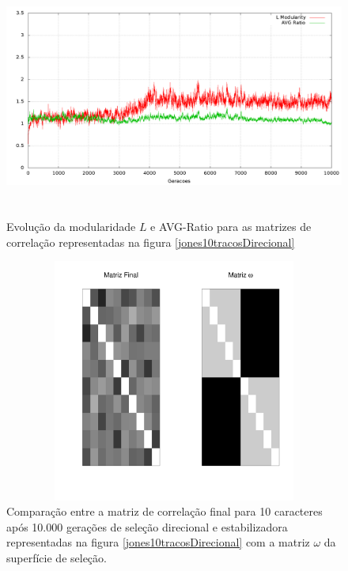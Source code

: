 \begin{figure}[htbp]
    \centering
    \includegraphics[width=150mm, height=80mm]{figuras/jones10tracosDirecionalStats.png}
    \caption{Evolução da modularidade $L$ e AVG-Ratio para as matrizes de
    correlação representadas na figura \ref{jones10tracosDirecional}}
    \label{jones10tracosDirecionalStats}
\end{figure}



\begin{figure}[htbp]
    \centering
    \includegraphics[width=150mm, height=80mm]{figuras/Mat10tracosDirecional}
    \caption{Comparação entre a matriz de correlação final para 10 caracteres
        após 10.000 gerações de seleção direcional e estabilizadora
        representadas na figura \ref{jones10tracosDirecional} com a matriz
    $\omega$ da superfície de seleção.}
    \label{MatJones10tracosDirecional}
\end{figure}


